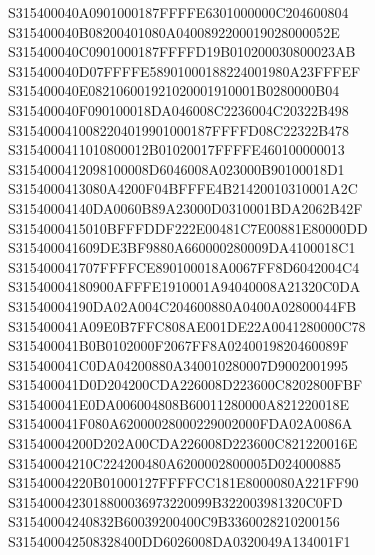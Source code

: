 \documentclass[12pt,a4paper]{article}
\begin{document}
\begin{framed}
{S315400040A0901000187FFFFE6301000000C204600804\newline
S315400040B08200401080A0400892200019028000052E\newline
S315400040C0901000187FFFFD19B010200030800023AB\newline
S315400040D07FFFFE58901000188224001980A23FFFEF\newline
S315400040E082106001921020001910001B0280000B04\newline
S315400040F090100018DA046008C2236004C20322B498\newline
S3154000410082204019901000187FFFFD08C22322B478\newline
S3154000411010800012B01020017FFFFE460100000013\newline
S3154000412098100008D6046008A023000B90100018D1\newline
S3154000413080A4200F04BFFFE4B21420010310001A2C\newline
S31540004140DA0060B89A23000D0310001BDA2062B42F\newline
S3154000415010BFFFDDF222E00481C7E00881E80000DD\newline
S315400041609DE3BF9880A660000280009DA4100018C1\newline
S315400041707FFFFCE890100018A0067FF8D6042004C4\newline
S31540004180900AFFFE1910001A94040008A21320C0DA\newline
S31540004190DA02A004C204600880A0400A02800044FB\newline
S315400041A09E0B7FFC808AE001DE22A0041280000C78\newline
S315400041B0B0102000F2067FF8A0240019820460089F\newline
S315400041C0DA04200880A340010280007D9002001995\newline
S315400041D0D204200CDA226008D223600C8202800FBF\newline
S315400041E0DA006004808B60011280000A821220018E\newline
S315400041F080A62000028000229002000FDA02A0086A\newline
S31540004200D202A00CDA226008D223600C821220016E\newline
S31540004210C224200480A6200002800005D024000885\newline
S31540004220B01000127FFFFCC181E8000080A221FF90\newline
S3154000423018800036973220099B322003981320C0FD\newline
S31540004240832B60039200400C9B3360028210200156\newline
S315400042508328400DD6026008DA0320049A134001F1\newline
}
\end{framed}
\end{document}
